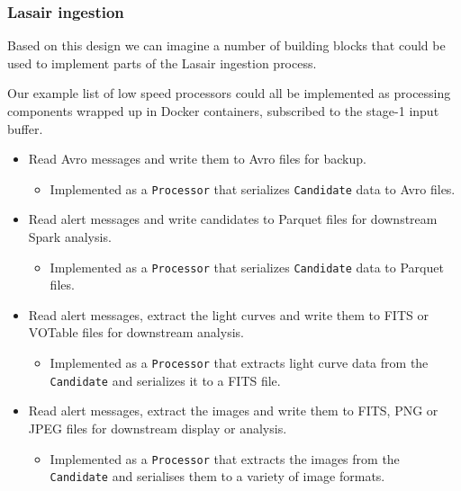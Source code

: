 \documentclass{article}
\newcommand{\avro} {Avro\xspace}
\newcommand{\fits} {FITS\xspace}
\newcommand{\png} {PNG\xspace}
\newcommand{\jpeg} {JPEG\xspace}
\newcommand{\parquet} {Parquet\xspace}
\newcommand{\votable} {VOTable\xspace}
\newcommand{\docker} {Docker\xspace}
\newcommand{\spark} {Spark\xspace}
\newcommand{\stageone} {stage-1\xspace}
\newcommand{\lasair} {Lasair\xspace}
\begin{document}
\subsubsection{Lasair ingestion}
\label{workflow.lasair-ingestion}

Based on this design we can imagine a number of building blocks that could be used to implement parts of the \lasair ingestion process.

Our example list of low speed processors could all be implemented as processing components wrapped up in \docker containers, subscribed to the \stageone input buffer.

\begin{itemize}
  \item Read \avro messages and write them to \avro files for backup.
  \begin{itemize}
    \item Implemented as a \texttt{Processor} that serializes \texttt{Candidate} data to \avro files.
  \end{itemize}

  \item Read alert messages and write candidates to \parquet files for downstream \spark analysis.
  \begin{itemize}
    \item Implemented as a \texttt{Processor} that serializes \texttt{Candidate} data to \parquet files.
  \end{itemize}

  \item Read alert messages, extract the light curves and write them to \fits or \votable files for downstream analysis.
  \begin{itemize}
    \item Implemented as a \texttt{Processor} that extracts light curve data from the \texttt{Candidate} and serializes it to a \fits file.
  \end{itemize}

  \item Read alert messages, extract the images and write them to \fits, \png or \jpeg files for downstream display or analysis.
  
  \begin{itemize}
    \item Implemented as a \texttt{Processor} that extracts the images from the \texttt{Candidate} and serialises them to a variety of image formats.
  \end{itemize}
\end{itemize}
\end{document}
